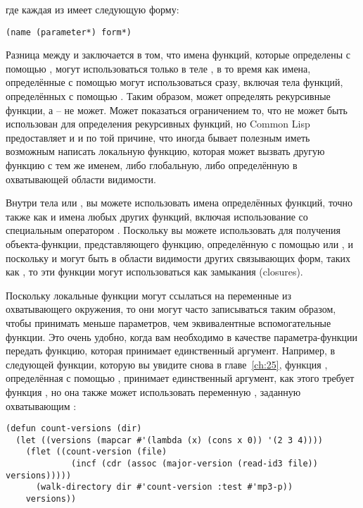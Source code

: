 где каждая из  имеет следующую форму:

\begin{lstlisting}
(name (parameter*) form*)
\end{lstlisting}

Разница между  и  заключается в том, что имена функций, которые
определены с помощью , могут использоваться только в теле , в то
время как имена, определённые с помощью  могут использоваться сразу, включая
тела функций, определённых с помощью . Таким образом,  может
определять рекурсивные функции, а  -- не может.  Может показаться ограничением
то, что  не может быть использован для определения рекурсивных функций, но
Common Lisp предоставляет и  и  по той причине, что иногда бывает
полезным иметь возможным написать локальную функцию, которая может вызвать другую функцию
с тем же именем, либо глобальную, либо определённую в охватывающей области видимости.

Внутри тела  или , вы можете использовать имена определённых
функций, точно также как и имена любых других функций, включая использование со
специальным оператором .  Поскольку вы можете использовать 
для получения объекта-функции, представляющего функцию, определённую с помощью 
или , и поскольку  и  могут быть в области видимости
других связывающих форм, таких как , то эти функции могут использоваться как
замыкания (closures).

Поскольку локальные функции могут ссылаться на переменные из охватывающего окружения, то
они могут часто записываться таким образом, чтобы принимать меньше параметров, чем
эквивалентные вспомогательные функции.  Это очень удобно, когда вам необходимо в качестве
параметра-функции передать функцию, которая принимает единственный аргумент. Например, в
следующей функции, которую вы увидите снова в главе~\ref{ch:25}, функция
, определённая с помощью , принимает единственный аргумент,
как этого требует функция , но она также может использовать
переменную , заданную охватывающим :

\begin{lstlisting}
(defun count-versions (dir)
  (let ((versions (mapcar #'(lambda (x) (cons x 0)) '(2 3 4))))
    (flet ((count-version (file)
             (incf (cdr (assoc (major-version (read-id3 file)) versions)))))
      (walk-directory dir #'count-version :test #'mp3-p))
    versions))
\end{lstlisting}

